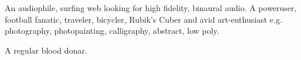

\begin{cvparagraph}

  An audiophile, surfing web looking for high fidelity, binaural audio.
  A poweruser, football fanatic, traveler, bicycler, Rubik's Cuber and avid art-enthusiast e.g. photography, photopainting, calligraphy, abstract, low poly.
  \par A regular blood donar.
\end{cvparagraph}  
